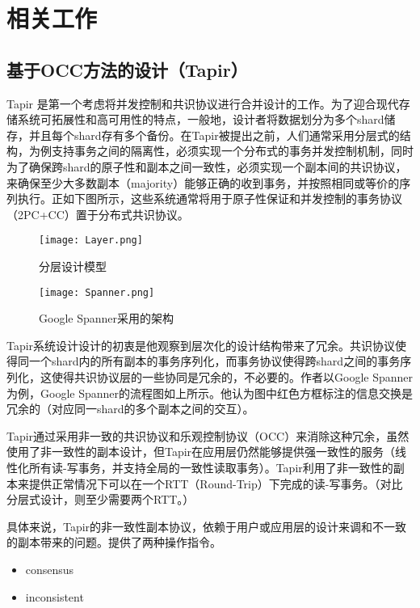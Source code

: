 
\chapter{相关工作}

\section{基于OCC方法的设计（Tapir）}
Tapir 是第一个考虑将并发控制和共识协议进行合并设计的工作。为了迎合现代存储系统可拓展性和高可用性的特点，一般地，设计者将数据划分为多个shard储存，并且每个shard存有多个备份。在Tapir被提出之前，人们通常采用分层式的结构，为例支持事务之间的隔离性，必须实现一个分布式的事务并发控制机制，同时为了确保跨shard的原子性和副本之间一致性，必须实现一个副本间的共识协议，来确保至少大多数副本（majority）能够正确的收到事务，并按照相同或等价的序列执行。正如下图所示，这些系统通常将用于原子性保证和并发控制的事务协议（2PC+CC）置于分布式共识协议。

\begin{figure}[htb]
  \centering
  \texttt{[image: Layer.png]}
  \caption{分层设计模型}
  \label{fig:badge}
\end{figure}

\begin{figure}[htb]
  \centering
  \texttt{[image: Spanner.png]}
  \caption{Google Spanner采用的架构}
  \label{fig:badge}
\end{figure}

Tapir系统设计设计的初衷是他观察到层次化的设计结构带来了冗余。共识协议使得同一个shard内的所有副本的事务序列化，而事务协议使得跨shard之间的事务序列化，这使得共识协议层的一些协同是冗余的，不必要的。作者以Google Spanner为例，Google Spanner的流程图如上所示。他认为图中红色方框标注的信息交换是冗余的（对应同一shard的多个副本之间的交互）。

Tapir通过采用非一致的共识协议和乐观控制协议（OCC）来消除这种冗余，虽然使用了非一致性的副本设计，但Tapir在应用层仍然能够提供强一致性的服务（线性化所有读-写事务，并支持全局的一致性读取事务）。Tapir利用了非一致性的副本来提供正常情况下可以在一个RTT（Round-Trip）下完成的读-写事务。（对比分层式设计，则至少需要两个RTT。）

具体来说，Tapir的非一致性副本协议，依赖于用户或应用层的设计来调和不一致的副本带来的问题。提供了两种操作指令。

\begin{itemize}
\item consensus
\item inconsistent
\end{itemize}

